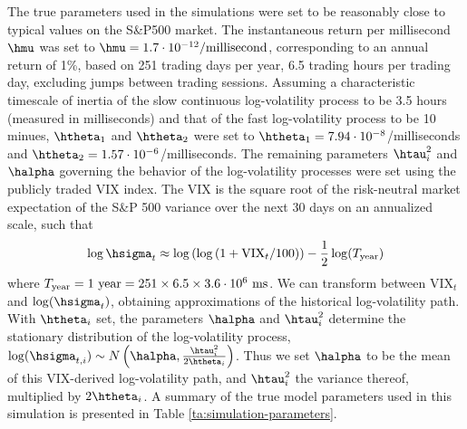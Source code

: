 The true parameters used in the simulations were set to be reasonably close to typical values on the S\&P500 market. The instantaneous return per millisecond $\hmu$ was set to $\hmu = 1.7 \cdot 10^{-12}/\mbox{millisecond}$, corresponding to an annual return of 1\%, based on 251 trading days per year, 6.5 trading hours per trading day, excluding jumps between trading sessions. Assuming a characteristic timescale of inertia of the slow continuous log-volatility process to be 3.5 hours (measured in milliseconds) and that of the fast log-volatility process to be 10 minues, $\htheta_1$ and $\htheta_2$ were set to $\htheta_1 = 7.94\cdot 10^{-8}$/milliseconds and $\htheta_2 = 1.57\cdot 10^{-6}$/milliseconds. The remaining parameters $\htau_i^2$ and $\halpha$ governing the behavior of the log-volatility processes were set using the publicly traded VIX index. The VIX is the square root of the risk-neutral market expectation of the S\&P 500 variance over the next 30 days on an annualized scale, such that
$$
\log \hsigma_t \approx \log\left( \log\left(1 + \mbox{VIX}_t / 100 \right) \right) - \frac{1}{2} \log(T_{\rm year})
$$
where $T_{\rm year} = 1 \mbox{ year} = 251 \times 6.5 \times 3.6 \cdot 10^6 \mbox{ ms}$. We can transform between $\mbox{VIX}_t$ and $\log(\hsigma_t)$, obtaining approximations of the historical log-volatility path. With $\htheta_i$ set, the parameters $\halpha$ and $\htau_i^2$ determine the stationary distribution of the log-volatility process, $\log(\hsigma_{t,i}) \sim N\left(\halpha, \frac{\htau_i^2}{2\htheta_i}\right)$.  Thus we set $\halpha$ to be the mean of this VIX-derived log-volatility path, and $\htau_i^2$ the variance thereof, multiplied by $2\htheta_i$.  A summary of the true model parameters used in this simulation is presented in Table \ref{ta:simulation-parameters}.
